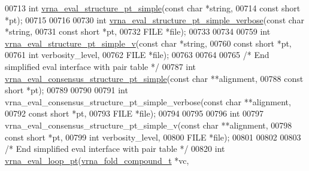 \begin{DoxyCode}
00713 \textcolor{keywordtype}{int} \hyperlink{group__eval_ga0bba59b4d6e53461088666ff4aece7b0}{vrna\_eval\_structure\_pt\_simple}(\textcolor{keyword}{const} \textcolor{keywordtype}{char}  *\textcolor{keywordtype}{string},
00714                                   \textcolor{keyword}{const} \textcolor{keywordtype}{short} *pt);
00715 
00716 
00730 \textcolor{keywordtype}{int} \hyperlink{group__eval_ga76e152ee9a02be23da14cdddf52b4e44}{vrna\_eval\_structure\_pt\_simple\_verbose}(\textcolor{keyword}{const} \textcolor{keywordtype}{char}  *\textcolor{keywordtype}{string},
00731                                           \textcolor{keyword}{const} \textcolor{keywordtype}{short} *pt,
00732                                           FILE        *file);
00733 
00734 
00759 \textcolor{keywordtype}{int} \hyperlink{group__eval_gac40b813d35289da9816d0c1eec94faa5}{vrna\_eval\_structure\_pt\_simple\_v}(\textcolor{keyword}{const} \textcolor{keywordtype}{char}  *\textcolor{keywordtype}{string},
00760                                     \textcolor{keyword}{const} \textcolor{keywordtype}{short} *pt,
00761                                     \textcolor{keywordtype}{int}         verbosity\_level,
00762                                     FILE        *file);
00763 
00764 
00765 \textcolor{comment}{/* End simplified eval interface with pair table */}
00787 \textcolor{keywordtype}{int} \hyperlink{group__eval_gabbb4d2a7aa324ec9cce8f47ce61ab8af}{vrna\_eval\_consensus\_structure\_pt\_simple}(\textcolor{keyword}{const} \textcolor{keywordtype}{char}  **alignment,
00788                                             \textcolor{keyword}{const} \textcolor{keywordtype}{short} *pt);
00789 
00790 
00791 \textcolor{keywordtype}{int} vrna\_eval\_consensus\_structure\_pt\_simple\_verbose(\textcolor{keyword}{const} \textcolor{keywordtype}{char}  **alignment,
00792                                                     \textcolor{keyword}{const} \textcolor{keywordtype}{short} *pt,
00793                                                     FILE        *file);
00794 
00795 
00796 \textcolor{keywordtype}{int}
00797 vrna\_eval\_consensus\_structure\_pt\_simple\_v(\textcolor{keyword}{const} \textcolor{keywordtype}{char}  **alignment,
00798                                           \textcolor{keyword}{const} \textcolor{keywordtype}{short} *pt,
00799                                           \textcolor{keywordtype}{int}         verbosity\_level,
00800                                           FILE        *file);
00801 
00802 
00803 \textcolor{comment}{/* End simplified eval interface with pair table */}
00820 \textcolor{keywordtype}{int} \hyperlink{group__eval_ga730ba4df55c02fd530a0cddd49faf760}{vrna\_eval\_loop\_pt}(\hyperlink{group__fold__compound_structvrna__fc__s}{vrna\_fold\_compound\_t}  *vc,

\end{DoxyCode}
